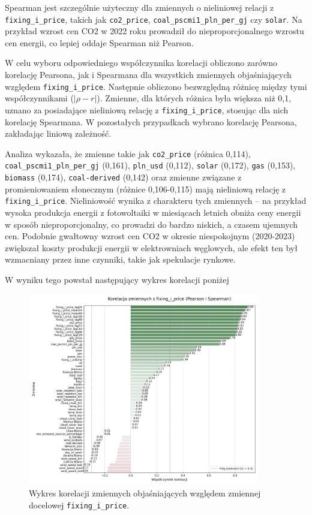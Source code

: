 Spearman jest szczególnie użyteczny dla zmiennych o nieliniowej relacji z \texttt{fixing\_i\_price}, takich jak \texttt{co2\_price}, \texttt{coal\_pscmi1\_pln\_per\_gj} czy \texttt{solar}. Na przykład wzrost cen CO2 w 2022 roku prowadził do nieproporcjonalnego wzrostu cen energii, co lepiej oddaje Spearman niż Pearson.

W celu wyboru odpowiedniego współczynnika korelacji obliczono zarówno korelację Pearsona, jak i Spearmana dla wszystkich zmiennych objaśniających względem \texttt{fixing\_i\_price}. Następnie obliczono bezwzględną różnicę między tymi współczynnikami (\(| \rho - r |\)). Zmienne, dla których różnica była większa niż 0,1, uznano za posiadające nieliniową relację z \texttt{fixing\_i\_price}, stosując dla nich korelację Spearmana. W pozostałych przypadkach wybrano korelację Pearsona, zakładając liniową zależność. 

Analiza wykazała, że zmienne takie jak \texttt{co2\_price} (różnica 0,114), \texttt{coal\_pscmi1\_pln\_per\_gj} (0,161), \texttt{pln\_usd} (0,112), \texttt{solar} (0,172), \texttt{gas} (0,153), \texttt{biomass} (0,174), \texttt{coal-derived} (0,142) oraz zmienne związane z promieniowaniem słonecznym (różnice 0,106-0,115) mają nieliniową relację z \texttt{fixing\_i\_price}. Nieliniowość wynika z charakteru tych zmiennych – na przykład wysoka produkcja energii z fotowoltaiki w miesiącach letnich obniża ceny energii w sposób nieproporcjonalny, co prowadzi do bardzo niskich, a czasem ujemnych cen. Podobnie gwałtowny wzrost cen CO2 w okresie niespokojnym (2020-2023) zwiększał koszty produkcji energii w elektrowniach węglowych, ale efekt ten był wzmacniany przez inne czynniki, takie jak spekulacje rynkowe.

W wyniku tego powstał następujący wykres korelacji poniżej

\begin{figure}[H]
    \centering
    \includegraphics[width=0.9\textwidth]{../plots/correlation_with_fixing_i_price.png}
    \caption{Wykres korelacji zmiennych objaśniających względem zmiennej docelowej \texttt{fixing\_i\_price}.}
    \label{fig:correlation_plot}
\end{figure}

